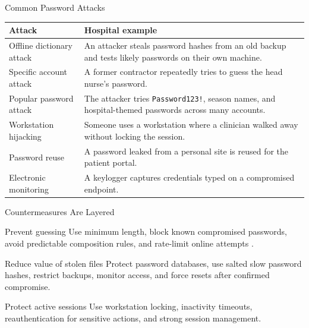\documentclass[presentation]{beamer}
\begin{document}
\begin{frame}[c]{Common Password Attacks}
  \small
  \begin{tabularx}{\textwidth}{@{}p{}X@{}}
    \toprule
    \textbf{Attack} & \textbf{Hospital example} \\
    \midrule
    Offline dictionary attack & An attacker steals password hashes from an old backup and tests likely passwords on their own machine. \\
    Specific account attack & A former contractor repeatedly tries to guess the head nurse's password. \\
    Popular password attack & The attacker tries \texttt{Password123!}, season names, and hospital-themed passwords across many accounts. \\
    Workstation hijacking & Someone uses a workstation where a clinician walked away without locking the session. \\
    Password reuse & A password leaked from a personal site is reused for the patient portal. \\
    Electronic monitoring & A keylogger captures credentials typed on a compromised endpoint. \\
    \bottomrule
  \end{tabularx}
\end{frame}

\begin{frame}[c]{Countermeasures Are Layered}
  \begin{block}{Prevent guessing}
    Use minimum length, block known compromised passwords, avoid predictable composition rules, and rate-limit online attempts \cite{nist80063b4}.
  \end{block}

  \begin{block}{Reduce value of stolen files}
    Protect password databases, use salted slow password hashes, restrict backups, monitor access, and force resets after confirmed compromise.
  \end{block}

  \begin{block}{Protect active sessions}
    Use workstation locking, inactivity timeouts, reauthentication for sensitive actions, and strong session management.
  \end{block}
\end{frame}
\end{document}
